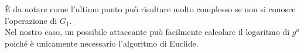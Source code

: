 È da notare come l'ultimo punto può risultare molto complesso se non si conosce l'operazione di $G_1$.\\
Nel nostro caso, un possibile attaccante può facilmente calcolare il logaritmo di $g^a$ poiché è unicamente necessario l'algoritmo di Euclide.\\[0.5cm]

